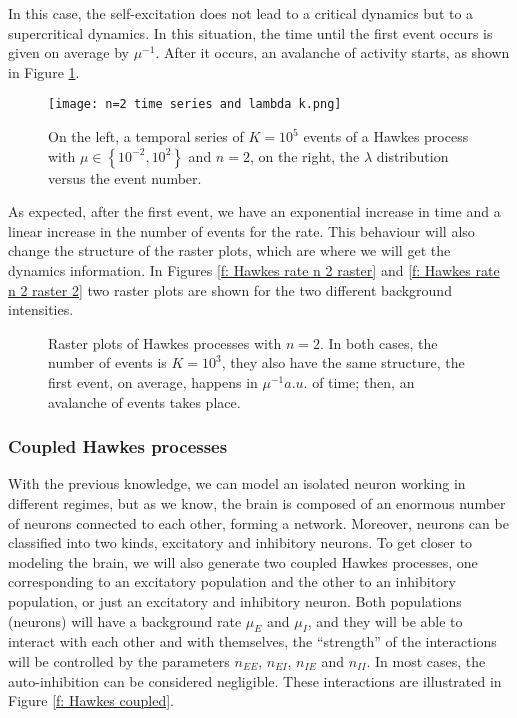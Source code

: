 In this case, the self-excitation does not lead to a critical dynamics but to a supercritical dynamics. In this situation, the time until the first event occurs is given on average by $\mu^{-1}$.
After it occurs, an avalanche of activity starts, as shown in Figure \ref{f: Hawkes rate n 2}.

\begin{figure}[H]
    \centering
    \texttt{[image: n=2 time series and lambda k.png]}
    \caption{On the left, a temporal series of $K=10^5$ events of a Hawkes process with $\mu\in \left\{ 10^{-2},10^{2}\right\}$ and $n=2$, on the right, the $\lambda$ distribution versus 
    the event number.}
    \label{f: Hawkes rate n 2}
\end{figure}

As expected, after the first event, we have an exponential increase in time and a linear increase in the number of events for the rate. This behaviour will also change the structure of the 
raster plots, which are where we will get the dynamics information. In Figures \ref{f: Hawkes rate n 2 raster} and \ref{f: Hawkes rate n 2 raster 2} two raster plots are shown for the
two different background intensities.

\begin{figure}[H]
    \subfigure[Background rate $\mu=10^{-4}$.]{
        \texttt{[image: raster n=2 mu=10-4.png]}
        \label{f: Hawkes rate n 2 raster}
    }
    \subfigure[Background rate $\mu=10^{2}$.]{
        \texttt{[image: raster n=2 mu=10+2.png]}
     \label{f: Hawkes rate n 2 raster 2}    
    }
    \caption{Raster plots of Hawkes processes with $n=2$. In both cases, the number of events is $K=10^3$, they also have the same structure, the first event, on average,
    happens in $\mu^{-1}a.u.$ of time; then, an avalanche of events takes place.}
    \label{f: Hawkes rate n 2 rasters}
\end{figure}

\subsubsection{Coupled Hawkes processes} \label{subsubsec:Coupled_Hawkes_processes}
With the previous knowledge, we can model an isolated neuron working in different regimes, but as we know, the brain is composed of an enormous number of neurons connected to each 
other, forming a network. Moreover, neurons can be classified into two kinds, excitatory and inhibitory neurons. To get closer to modeling the brain, we will also generate two coupled
Hawkes processes, one corresponding to an excitatory population and the other to an inhibitory population, or just an excitatory and inhibitory neuron. 
Both populations (neurons) will have a background rate  $\mu_E$ and $\mu_I$, and they will be able to interact with each other and with themselves, the ``strength'' of the interactions 
will be controlled by the parameters $n_{EE}$, $n_{EI}$, $n_{IE}$ and $n_{II}$. In most cases, the auto-inhibition can be considered negligible. 
These interactions are illustrated in Figure \ref{f: Hawkes coupled}.  

